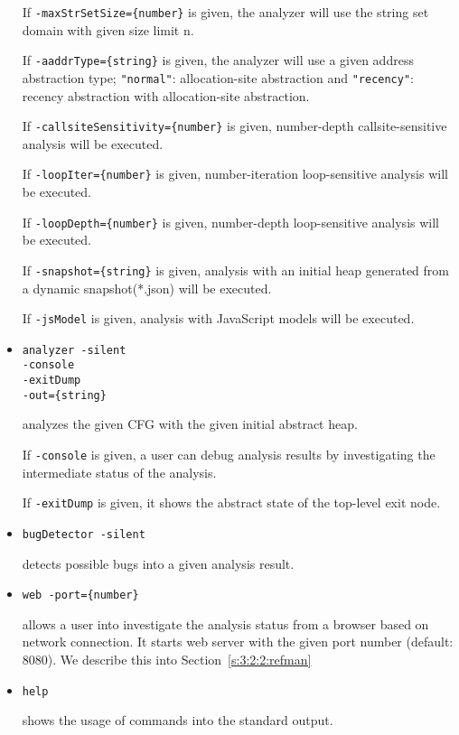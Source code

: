\begin{itemize}
If \verb!-maxStrSetSize={number}! is given,
the analyzer will use the string set domain with given size limit n.

If \verb!-aaddrType={string}! is given,
the analyzer will use a given address abstraction type;
\verb!"normal"!: allocation-site abstraction and
\verb!"recency"!: recency abstraction with allocation-site abstraction.

If \verb!-callsiteSensitivity={number}! is given,
{number}-depth callsite-sensitive analysis will be executed.

If \verb!-loopIter={number}! is given,
{number}-iteration loop-sensitive analysis will be executed.

If \verb!-loopDepth={number}! is given,
{number}-depth loop-sensitive analysis will be executed.

If \verb!-snapshot={string}! is given,
analysis with an initial heap generated from a dynamic snapshot(*.json)
will be executed.

If \verb!-jsModel! is given,
analysis with JavaScript models will be executed.

\item \verb!analyzer -silent!\\
\hspace*{4.7em}\verb!-console!\\
\hspace*{4.7em}\verb!-exitDump!\\
\hspace*{4.7em}\verb!-out={string}!

analyzes the given CFG with the given initial abstract heap.

If \verb!-console! is given,
a user can debug analysis results by investigating the intermediate
status of the analysis.

If \verb!-exitDump! is given,
it shows the abstract state of the top-level exit node.

\item \verb!bugDetector -silent!

detects possible bugs into a given analysis result.

\item \verb!web -port={number}!

allows a user into investigate the analysis status from a browser
based on network connection. It starts web server with the given
port number (default: 8080). We describe this into Section~\ref{s:3:2:2:refman}

\item \verb!help!

shows the usage of \safe commands into the standard output.
\end{itemize}

